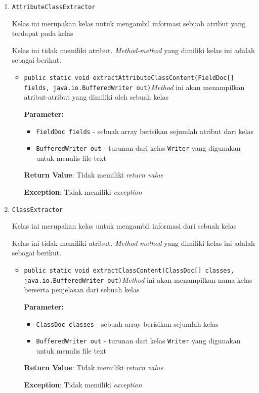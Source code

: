 \documentclass{article}
\begin{document}
\begin{enumerate}
\item \texttt{AttributeClassExtractor}

Kelas ini merupakan kelas untuk mengambil informasi sebuah atribut yang
 terdapat pada kelas

Kelas ini tidak memiliki atribut. \textit{Method-method} yang dimiliki kelas ini adalah sebagai berikut.
\begin{itemize}
\item \texttt{public static void extractAttributeClassContent(FieldDoc[] fields, java.io.BufferedWriter out)}\textit{Method} ini akan menampilkan atribut-atribut yang dimiliki oleh
 sebuah kelas

\textbf{Parameter:}
\begin{itemize}
\item \texttt{FieldDoc fields} - 
sebuah array berisikan sejumlah atribut dari kelas
\item \texttt{BufferedWriter out} - 
turunan dari kelas \texttt{Writer} yang digunakan untuk menulis
 file text
\end{itemize}
\textbf{Return Value}: Tidak memiliki \textit{return value}

\textbf{Exception}: Tidak memiliki \textit{exception}

\end{itemize}
\item \texttt{ClassExtractor}

Kelas ini merupakan kelas untuk mengambil informasi dari sebuah kelas

Kelas ini tidak memiliki atribut. \textit{Method-method} yang dimiliki kelas ini adalah sebagai berikut.
\begin{itemize}
\item \texttt{public static void extractClassContent(ClassDoc[] classes, java.io.BufferedWriter out)}\textit{Method} ini akan menampilkan nama kelas berserta penjelasan dari
 sebuah kelas

\textbf{Parameter:}
\begin{itemize}
\item \texttt{ClassDoc classes} - 
sebuah array berisikan sejumlah kelas
\item \texttt{BufferedWriter out} - 
turunan dari kelas \texttt{Writer} yang digunakan untuk menulis
                file text
\end{itemize}
\textbf{Return Value}: Tidak memiliki \textit{return value}

\textbf{Exception}: Tidak memiliki \textit{exception}


\end{itemize}
\end{enumerate}
\end{document}
